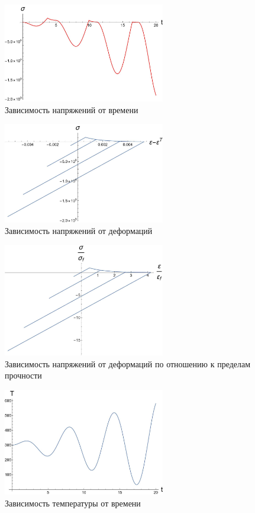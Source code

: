 \documentclass[12pt, a4paper]{article}
\begin{document}
\begin{enumerate}
  \begin{figure}[H]
  	\centering
  	\includegraphics[width=0.63\textwidth]{T1_3}
  	\caption{Зависимость напряжений от времени}
  \end{figure}
  
  \begin{figure}[H]
  	\centering
  	\includegraphics[width=0.63\textwidth]{T1_4}
  	\caption{Зависимость напряжений от деформаций}
  \end{figure}

  \begin{figure}[H]
  	\centering
  	\includegraphics[width=0.63\textwidth]{T1_5}
  	\caption{Зависимость напряжений от деформаций по отношению к пределам прочности}
  \end{figure}
  
  \begin{figure}[H]
  	\centering
  	\includegraphics[width=0.63\textwidth]{T1_6}
  	\caption{Зависимость температуры от времени}
  \end{figure}
\end{enumerate}
\end{document}
